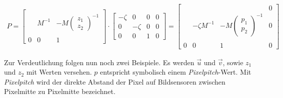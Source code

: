  	\begin{gather} 		
 		P 
		=
		\begin{bmatrix}
		&&\\
		&M^{-1}& -M\begin{pmatrix}z_1\\z_2\end{pmatrix}^{-1}\\
		&&\\
		0&0&1
		\end{bmatrix}
		\cdot
		\begin{bmatrix}
		-\zeta&0&0&0\\
		0&-\zeta&0&0\\
		0&0&1&0
		\end{bmatrix}
		=
		\begin{bmatrix}
		&&&0\\
		&-\zeta M^{-1}& -M\begin{pmatrix}p_1\\p_2\end{pmatrix}^{-1}&0\\
		&&&\\
		0&0&1&0
		\end{bmatrix}
		\end{gather}
	

		
		Zur Verdeutlichung folgen nun noch zwei Beispiele. Es werden $\vec{u}$ und $\vec{v}$, sowie $z_1$ und $z_2$ mit Werten versehen. $p$ entspricht symbolisch einem \textit{Pixelpitch}-Wert. Mit \textit{Pixelpitch} wird der direkte Abstand der Pixel auf Bildsensoren zwischen Pixelmitte zu Pixelmitte bezeichnet.\\
		
